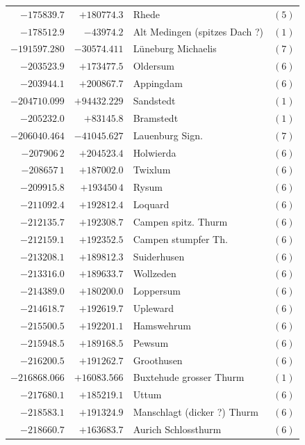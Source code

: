 \begin{center}
\begin{tabular}{r|r|p{170pt}|r}
\(-175839.7\)&\(+180774.3\)&Rhede&\((5)\)\\
\(-178512.9\)&\(-43974.2\)&Alt Medingen (spitzes Dach ?)&\((1)\)\\
\(-191597.280\)&\(-30574.411\)&Lüneburg Michaelis&\((7)\)\\
\(-203523.9\)&\(+173477.5\)&Oldersum&\((6)\)\\
\(-203944.1\)&\(+200867.7\)&Appingdam&\((6)\)\\
\(-204710.099\)&\(+94432.229\)&Sandstedt&\((1)\)\\
\(-205232.0\)&\(+83145.8\)&Bramstedt&\((1)\)\\
\(-206040.464\)&\(-41045.627\)&Lauenburg Sign.&\((7)\)\\
\(-207906\,2\)&\(+204523.4\)&Holwierda&\((6)\)\\
\(-208657\,1\)&\(+187002.0\)&Twixlum&\((6)\)\\
\(-209915.8\)&\(+193450\,4\)&Rysum&\((6)\)\\
\(-211092.4\)&\(+192812.4\)&Loquard&\((6)\)\\
\(-212135.7\)&\(+192308.7\)&Campen spitz. Thurm&\((6)\)\\
\(-212159.1\)&\(+192352.5\)&Campen stumpfer Th.&\((6)\)\\
\(-213208.1\)&\(+189812.3\)&Suiderhusen&\((6)\)\\
\(-213316.0\)&\(+189633.7\)&Wollzeden&\((6)\)\\
\(-214389.0\)&\(+180200.0\)&Loppersum&\((6)\)\\
\(-214618.7\)&\(+192619.7\)&Upleward&\((6)\)\\
\(-215500.5\)&\(+192201.1\)&Hamswehrum&\((6)\)\\
\(-215948.5\)&\(+189168.5\)&Pewsum&\((6)\)\\
\(-216200.5\)&\(+191262.7\)&Groothusen&\((6)\)\\
\(-216868.066\)&\(+16083.566\)&Buxtehude grosser Thurm&\((1)\)\\
\(-217680.1\)&\(+185219.1\)&Uttum&\((6)\)\\
\(-218583.1\)&\(+191324.9\)&Manschlagt (dicker ?) Thurm&\((6)\)\\
\(-218660.7\)&\(+163683.7\)&Aurich Schlossthurm&\((6)\)\\
\hline\end{tabular}\endgroup\end{center}
\clearpage
